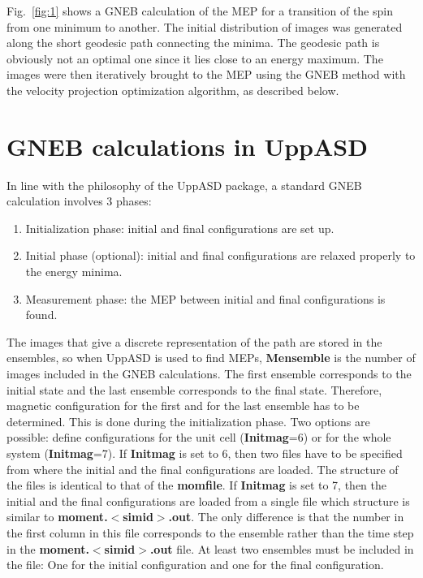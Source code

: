 \documentclass{article}
\begin{document}
Fig.~\ref{fig:1} shows a GNEB calculation of the MEP for a transition of the spin from one minimum to another. 
The initial distribution of images was generated along the short geodesic path connecting the minima. The geodesic path is obviously not an optimal one since it lies close to an energy maximum. 
The images were then iteratively brought to the MEP using the GNEB method with the velocity projection optimization algorithm, as described below.

\section{GNEB calculations in UppASD}

In line with the philosophy of the UppASD package, a standard GNEB calculation involves 3 phases: 
\begin{enumerate}
\item Initialization phase: initial and final configurations are set up.
\item Initial phase (optional): initial and final configurations are relaxed properly to the energy minima.
\item Measurement phase: the MEP between initial and final configurations is found.
\end{enumerate}

The images that give a discrete representation of the path are stored in the ensembles, so when UppASD is used to find MEPs, {\bf Mensemble} is the number of images included in the GNEB calculations. The first ensemble corresponds to the initial state and the last ensemble corresponds to the final state. Therefore, magnetic configuration for the first and for the last ensemble has to be determined. This is done during the initialization phase. Two options are possible: define configurations for the unit cell ({\bf Initmag}=6) or for the whole system ({\bf Initmag}=7). If {\bf Initmag} is set to 6, then two files have to be specified from where the initial and the final configurations are loaded. The structure of the files is identical to that of the {\bf momfile}. If {\bf Initmag} is set to 7, then the initial and the final configurations are loaded from a single file which structure is similar to {\bf moment.$<$simid$>$.out}. The only difference is that the number in the first column in this file corresponds to the ensemble rather than the time step in the {\bf moment.$<$simid$>$.out} file. At least two ensembles must be included in the file: One for the initial configuration and one for the final configuration.
\end{document}
